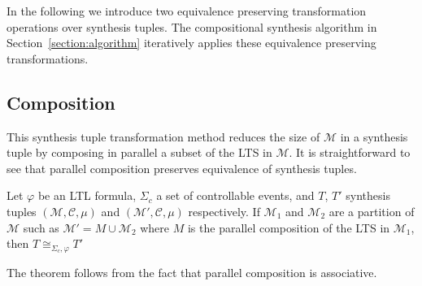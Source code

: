 In the following we introduce two equivalence preserving transformation 
operations over synthesis tuples. %
The compositional 
synthesis algorithm  in Section~\ref{section:algorithm} iteratively 
applies these equivalence preserving transformations. 






\subsection{Composition}
\label{subsection:composition}
This synthesis tuple transformation method  reduces the size of $\mathcal{M}$ in a synthesis tuple by composing in parallel a subset of the LTS in $\mathcal{M}$. It is straightforward to see that parallel composition preserves equivalence of synthesis tuples.

\begin{theorem} 
    Let $\varphi$ be an LTL formula, $\Sigma_c$ a set of controllable events,  and $T$, $T'$ synthesis tuples $(\mathcal{M}, \mathcal{C}, \mu)$ and $(\mathcal{M'}, \mathcal{C}, \mu)$ respectively. If $\mathcal{M}_1$ and $\mathcal{M}_2$ are a partition of $\mathcal{M}$ such as $\mathcal{M'} = M \cup \mathcal{M}_2$ where $M$ is the parallel composition of the LTS in $\mathcal{M}_1$, then 
    $T \cong_{\Sigma_c, \varphi} 
    T'$
\end{theorem}
The theorem follows from the fact that parallel composition is associative. %

